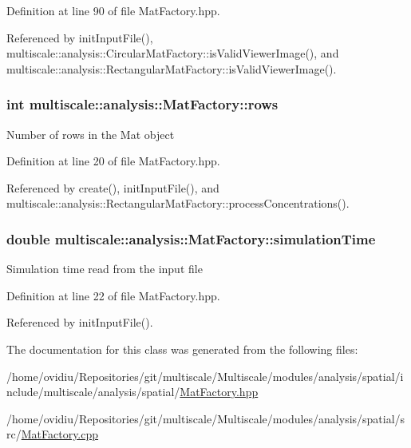 Definition at line 90 of file Mat\-Factory.\-hpp.



Referenced by init\-Input\-File(), multiscale\-::analysis\-::\-Circular\-Mat\-Factory\-::is\-Valid\-Viewer\-Image(), and multiscale\-::analysis\-::\-Rectangular\-Mat\-Factory\-::is\-Valid\-Viewer\-Image().

\hypertarget{classmultiscale_1_1analysis_1_1MatFactory_a35672fb0c992f662018ee7c146794474}{
\subsubsection[{rows}]{\setlength{\rightskip}{0pt plus 5cm}int multiscale\-::analysis\-::\-Mat\-Factory\-::rows\hspace{0.3cm}{\ttfamily [protected]}}}\label{classmultiscale_1_1analysis_1_1MatFactory_a35672fb0c992f662018ee7c146794474}
Number of rows in the Mat object 

Definition at line 20 of file Mat\-Factory.\-hpp.



Referenced by create(), init\-Input\-File(), and multiscale\-::analysis\-::\-Rectangular\-Mat\-Factory\-::process\-Concentrations().

\hypertarget{classmultiscale_1_1analysis_1_1MatFactory_a99caa620805ac50375699236d83fbd96}{
\subsubsection[{simulation\-Time}]{\setlength{\rightskip}{0pt plus 5cm}double multiscale\-::analysis\-::\-Mat\-Factory\-::simulation\-Time\hspace{0.3cm}{\ttfamily [protected]}}}\label{classmultiscale_1_1analysis_1_1MatFactory_a99caa620805ac50375699236d83fbd96}
Simulation time read from the input file 

Definition at line 22 of file Mat\-Factory.\-hpp.



Referenced by init\-Input\-File().



The documentation for this class was generated from the following files\-:\begin{DoxyCompactItemize}
\item 
/home/ovidiu/\-Repositories/git/multiscale/\-Multiscale/modules/analysis/spatial/include/multiscale/analysis/spatial/\hyperlink{MatFactory_8hpp}{Mat\-Factory.\-hpp}\item 
/home/ovidiu/\-Repositories/git/multiscale/\-Multiscale/modules/analysis/spatial/src/\hyperlink{MatFactory_8cpp}{Mat\-Factory.\-cpp}\end{DoxyCompactItemize}
